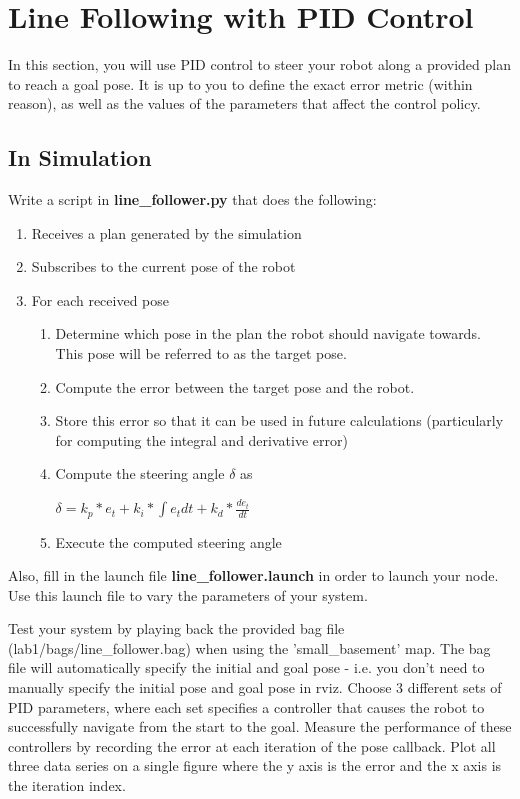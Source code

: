 \documentclass[final]{article}
\begin{document}
\section{Line Following with PID Control}
In this section, you will use PID control to steer your robot along a provided plan to reach a goal  pose. It is up to you to define the exact error metric (within reason), as well as the values of the parameters that affect the control policy.

\subsection{In Simulation}
Write a script in \textbf{line\_follower.py} that does the following:

\begin{enumerate}
\item Receives a plan generated by the simulation
\item Subscribes to the current pose of the robot
\item For each received pose
 \begin{enumerate}
 \item Determine which pose in the plan the robot should navigate towards. This pose will be referred to as the target pose.
 \item Compute the error between the target pose and the robot.
 \item Store this error so that it can be used in future calculations (particularly for computing the integral and derivative error)
 \item Compute the steering angle $\delta$ as \\
 
  \centerline{$\delta = k_p*e_t + k_i* \int e_t dt + k_d* \frac{de_t}{dt}$}
 
 \item Execute the computed steering angle
 \end{enumerate}
\end{enumerate}

Also, fill in the launch file \textbf{line\_follower.launch} in order to launch your node. Use this launch file to vary the parameters of your system.

Test your system by playing back the provided bag file (lab1/bags/line\_follower.bag) when using the 'small\_basement' map. The bag file will automatically specify the initial and goal pose - i.e. you don't need to manually specify the initial pose and goal pose in rviz. Choose 3 different sets of PID parameters, where each set specifies a controller that causes the robot to successfully navigate from the start to the goal. Measure the performance of these controllers by recording the error at each iteration of the pose callback. Plot all three data series on a single figure where the y axis is the error and the x axis is the iteration index.
\end{document}
